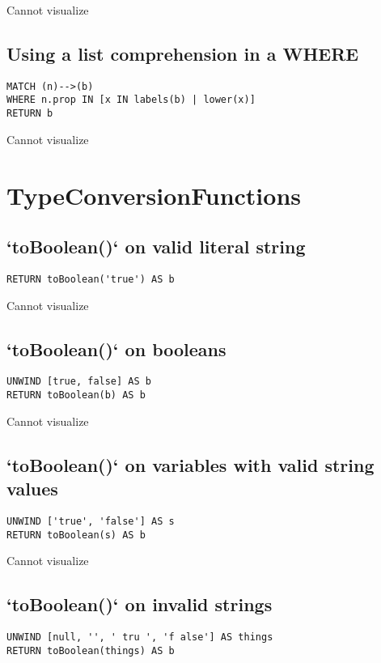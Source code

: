 Cannot visualize
\subsection{Using a list comprehension in a WHERE}

\begin{lstlisting}
MATCH (n)-->(b)
WHERE n.prop IN [x IN labels(b) | lower(x)]
RETURN b
\end{lstlisting}

Cannot visualize
\section{TypeConversionFunctions}

\subsection{`toBoolean()` on valid literal string}

\begin{lstlisting}
RETURN toBoolean('true') AS b
\end{lstlisting}

Cannot visualize
\subsection{`toBoolean()` on booleans}

\begin{lstlisting}
UNWIND [true, false] AS b
RETURN toBoolean(b) AS b
\end{lstlisting}

Cannot visualize
\subsection{`toBoolean()` on variables with valid string values}

\begin{lstlisting}
UNWIND ['true', 'false'] AS s
RETURN toBoolean(s) AS b
\end{lstlisting}

Cannot visualize
\subsection{`toBoolean()` on invalid strings}

\begin{lstlisting}
UNWIND [null, '', ' tru ', 'f alse'] AS things
RETURN toBoolean(things) AS b
\end{lstlisting}

